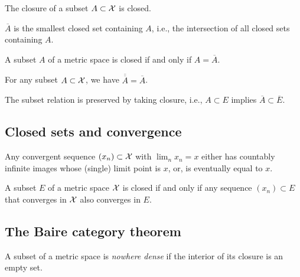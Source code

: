\begin{lem}
  \label{lem:closureIsClosed}
  The closure of a subset $A\subset{\cal X}$ is closed.
\end{lem}

\begin{coro}
  \label{coro:closureBeingSmallest}
  $\overline{A}$ is the smallest closed set containing $A$, 
  i.e., the intersection of all closed sets containing $A$.
\end{coro}

\begin{coro}
  \label{coro:closedFromClosure}
  A subset $A$ of a metric space is closed
  if and only if $A=\overline{A}$.
\end{coro}

\begin{coro}
  \label{coro:closureIdempotence}
  For any subset $A\subset {\cal X}$,
  we have $\overline{\overline{A}}=\overline{A}$. 
\end{coro}

\begin{coro}
  \label{coro:closurePreserveSubset}
  The subset relation is preserved by taking closure, 
  i.e., $A\subset E$ implies $\overline{A}\subset \overline{E}$.
\end{coro}

\subsection{Closed sets and convergence}
\label{sec:clos-sets-conv}

\begin{lem}
  \label{lem:converge2cases}
  Any convergent sequence $(x_n)\subset{\cal X}$ with $\lim_n x_n =x$
  either has countably infinite images whose (single) limit point is
  $x$, 
  or, is eventually equal to $x$.
\end{lem}

\begin{lem}
  \label{lem:closedSetConvergence}
  A subset $E$ of a metric space ${\cal X}$ is closed
  if and only if any sequence $(x_n)\subset E$
  that converges in ${\cal X}$ also converges in $E$.
\end{lem}

\subsection{The Baire category theorem}

\begin{defn}
  \label{def:nowhereDense}
  A subset of a metric space is \emph{nowhere dense}
  if the interior of its closure is an empty set.
\end{defn}

